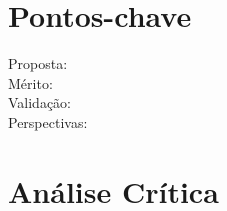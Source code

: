 \documentclass{UnBExam}%
\begin{document}
	\section{Pontos-chave}%

	\begin{description}
		\item[Proposta:]%

		\item[Mérito:]%

		\item[Validação:]%

		\item[Perspectivas:]%
	\end{description}%

	\section{Análise Crítica}%

\end{document}
